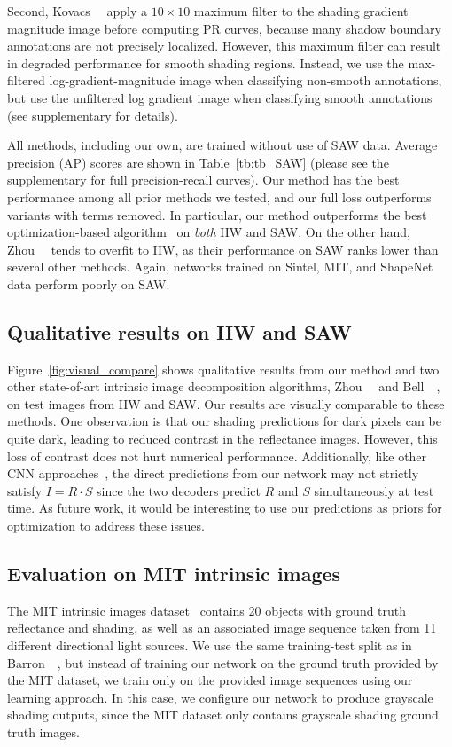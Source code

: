 \documentclass[10pt,twocolumn,letterpaper]{article}
\begin{document}
Second, Kovacs~\etal~ \cite{kovacs2017shading} apply a $10\times 10$
maximum filter to the shading gradient magnitude image before
computing PR curves, because many shadow boundary annotations are not
precisely localized.
However, this maximum filter can result in degraded performance for
smooth shading regions. 
Instead, we use the max-filtered log-gradient-magnitude image when
classifying non-smooth annotations, but use the unfiltered log
gradient image when classifying smooth annotations (see supplementary
for details).

All methods, including our own, are trained without use of SAW data.
Average precision (AP) scores  are shown in Table~\ref{tb:tb_SAW} (please see the supplementary for
full precision-recall curves).
Our method has the best performance among all prior methods we tested,
and our full loss outperforms variants with terms removed. In
particular, our method outperforms the best optimization-based
algorithm~\cite{bell2014intrinsic} on {\em both} IIW and SAW. On the
other hand, Zhou~\etal~\cite{zhou2015learning} tends to overfit to
IIW, as their performance on SAW ranks lower than several other
methods. Again, networks trained on Sintel, MIT, and ShapeNet data
perform poorly on SAW.

\subsection{Qualitative results on IIW and SAW}
Figure~\ref{fig:visual_compare} shows qualitative results from our
method and two other state-of-art intrinsic image decomposition
algorithms, Zhou~\etal~\cite{zhou2015learning} and
Bell~\etal~\cite{bell2014intrinsic}, on test images from IIW and SAW.
Our results are visually comparable to these methods. One observation
is that our shading predictions for dark pixels can be quite dark,
leading to reduced contrast in the reflectance images. However, this loss of contrast does not hurt numerical performance. Additionally, like other CNN approaches~\cite{narihira2015direct, shi2016learning}, the direct predictions from our network may not strictly satisfy $I = R \cdot S$ since the two decoders predict $R$ and $S$ simultaneously at test time.  As future work, it would be interesting to use our predictions as priors for optimization to
address these issues.

\subsection{Evaluation on MIT intrinsic images}
The MIT intrinsic images dataset~\cite{grosse2009ground} contains 20
objects with ground truth reflectance and shading, as well as an
associated image sequence taken from 11 different directional light
sources. We use the same training-test split as in
Barron~\etal~\cite{barron2015shape}, but instead of training our
network on the ground truth provided by the MIT dataset, we train only
on the provided image sequences using our learning approach.
In this case, we configure our network to produce grayscale shading
outputs, since the MIT dataset only contains grayscale shading ground
truth images.
\end{document}
